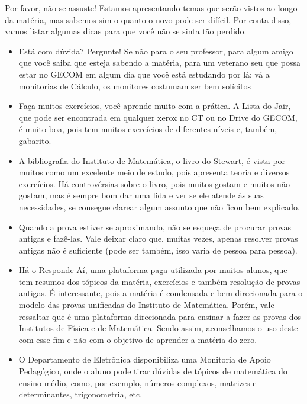             Por favor, não se assuste! Estamos apresentando temas que serão vistos ao longo da matéria, mas sabemos sim o quanto o novo pode ser difícil. Por conta disso, vamos listar algumas dicas para que você não se sinta tão perdido.
            
            \begin{itemize}
            	\item Está com dúvida? Pergunte! Se não para o seu professor, para algum amigo que você saiba que esteja sabendo a matéria, para um veterano seu que possa estar no GECOM em algum dia que você está estudando por lá; vá a monitorias de Cálculo, os monitores costumam ser bem solícitos
                \item Faça muitos exercícios, você aprende muito com a prática. A Lista do Jair, que pode ser encontrada em qualquer xerox no CT ou no Drive do GECOM, é muito boa, pois tem muitos exercícios de diferentes níveis e, também, gabarito.
                \item A bibliografia do Instituto de Matemática, o livro do Stewart, é vista por muitos como um excelente meio de estudo, pois apresenta teoria e diversos exercícios. Há controvérsias sobre o livro, pois muitos gostam e muitos não gostam, mas é sempre bom dar uma lida e ver se ele atende às suas necessidades, se consegue clarear algum assunto que não ficou bem explicado.
                \item Quando a prova estiver se aproximando, não se esqueça de procurar provas antigas e fazê-las. Vale deixar claro que, muitas vezes, apenas resolver provas antigas não é suficiente (pode ser também, isso varia de pessoa para pessoa).
                \item Há o Responde Aí, uma plataforma paga utilizada por muitos alunos, que tem resumos dos tópicos da matéria, exercícios e também resolução de provas antigas. É interessante, pois a matéria é condensada e bem direcionada para o modelo das provas unificadas do Instituto de Matemática. Porém, vale ressaltar que é uma plataforma direcionada para ensinar a fazer as provas dos Institutos de Física e de Matemática. Sendo assim, aconselhamos o uso deste com esse fim e não com o objetivo de aprender a matéria do zero.
                \item O Departamento de Eletrônica disponibiliza uma Monitoria de Apoio Pedagógico, onde o aluno pode tirar dúvidas de tópicos de matemática do ensino médio, como, por exemplo, números complexos, matrizes e determinantes, trigonometria, etc.
            \end{itemize}
            
